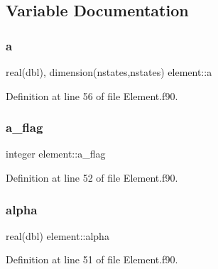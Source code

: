 \subsection{Variable Documentation}
\mbox{\label{namespaceelement_ad0c7d68510d195a504efc593e729263f}} 
\subsubsection{\texorpdfstring{a}{a}}
{\footnotesize\ttfamily real(dbl), dimension(nstates,nstates) element\+::a\hspace{0.3cm}{\ttfamily [private]}}



Definition at line 56 of file Element.\+f90.

\mbox{\label{namespaceelement_a17661475127df7ce4d09fb1e942cbd58}} 
\subsubsection{\texorpdfstring{a\+\_\+flag}{a\_flag}}
{\footnotesize\ttfamily integer element\+::a\+\_\+flag\hspace{0.3cm}{\ttfamily [private]}}



Definition at line 52 of file Element.\+f90.

\mbox{\label{namespaceelement_aa45829429fe33aa2b5cd6feaacc2c739}} 
\subsubsection{\texorpdfstring{alpha}{alpha}}
{\footnotesize\ttfamily real(dbl) element\+::alpha\hspace{0.3cm}{\ttfamily [private]}}



Definition at line 51 of file Element.\+f90.

\mbox{\label{namespaceelement_aab90697519f32a9a4f56786465c1bd0b}} 
